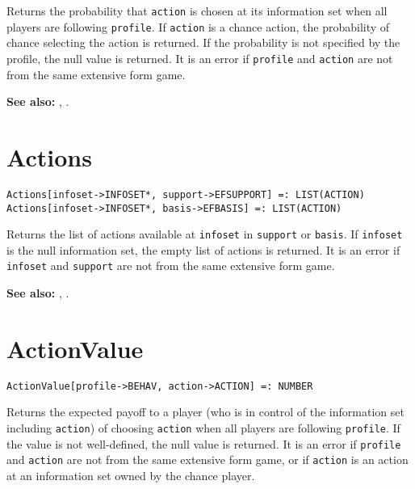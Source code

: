 Returns the probability that \verb+action+ is chosen at its
information set when all players are following \verb+profile+.
If \verb+action+ is a chance action, the probability of chance selecting
the action is returned.  If the probability is not specified by the 
profile, the null value is returned.  It is an error if \verb+profile+
and \verb+action+ are not from the same extensive form game.

\textbf{See also:} ,
.


\section*{Actions}\label{PrimActions}
\begin{verbatim} 
Actions[infoset->INFOSET*, support->EFSUPPORT] =: LIST(ACTION) 
Actions[infoset->INFOSET*, basis->EFBASIS] =: LIST(ACTION) 
\end{verbatim}

Returns the list of actions available at \verb+infoset+ in
\verb+support+ or \verb+basis+.  If \verb+infoset+ is the null
information set, the empty list of actions is returned.  It is an
error if \verb+infoset+ and \verb+support+ are not from the same
extensive form game.

\textbf{See also:} ,
.


\section*{ActionValue}\label{PrimActionValue}
\begin{verbatim}
ActionValue[profile->BEHAV, action->ACTION] =: NUMBER 
\end{verbatim}

Returns the expected payoff to a player (who is in control of the
information set including \verb+action+) of choosing \verb+action+ when
all players are following \verb+profile+.  If the value is not
well-defined, the null value is returned.  It is an error if
\verb+profile+ and \verb+action+ are not from the same extensive form
game, or if \verb+action+ is an action at an information set owned by
the chance player.

